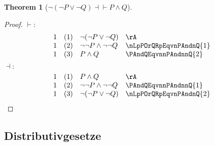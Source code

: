 \documentclass{book}
\theoremstyle{plain}
\newtheorem{theorem}{Theorem}
\theoremstyle{remark}
\theoremstyle{definition}
\begin{document}
\label{nLpnPOrnQRpEqvPAndQ}
\begin{theorem}[\(\neg(\neg P \lor \neg Q) \dashv \vdash P \land Q\)]
\end{theorem}
\begin{proof}
	\(\vdash:\)
	\[
	\begin{array}{llll}
		1 & (1) & \neg(\neg P \lor \neg Q) & \rA \\
		1 & (2) & \neg\neg P \land \neg\neg Q & \nLpPOrQRpEqvnPAndnQ{1} \\
		1 & (3) & P\land Q & \PAndQEqvnnPAndnnQ{2} \\
	\end{array}
	\]
	\(\dashv:\)
	\[
	\begin{array}{llll}
		1 & (1) & P \land Q & \rA \\
		1 & (2) & \neg\neg P \land \neg\neg Q & \PAndQEqvnnPAndnnQ{1} \\
        1 & (3) & \neg(\neg P \lor \neg Q) & \nLpPOrQRpEqvnPAndnQ{2} \\
	\end{array}
	\]
\end{proof}

\subsection{Distributivgesetze}
\end{document}
